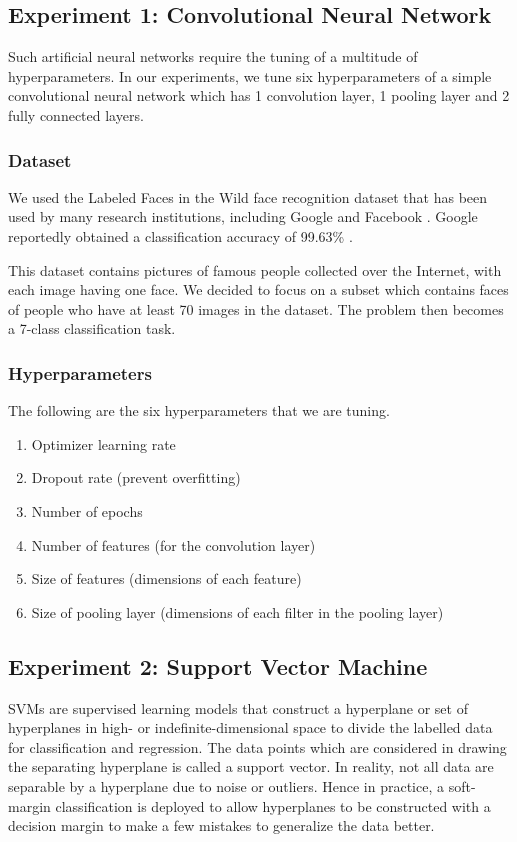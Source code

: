 \documentclass[letterpaper]{article}
\begin{document}
\subsection{Experiment 1: Convolutional Neural Network}
Such artificial neural networks require the tuning of a multitude of hyperparameters.
In our experiments, we tune six hyperparameters of a simple convolutional neural 
network which has 1 convolution layer, 1 pooling layer and 2 fully connected layers.

\subsubsection{Dataset}
We used the Labeled Faces in the Wild face recognition dataset that has been used
by many research institutions, including Google \cite{schroff2015facenet} and 
Facebook \cite{taigman2014deepface}. Google reportedly obtained a classification
accuracy of 99.63\% \cite{schroff2015facenet}.

This dataset contains pictures of famous people collected over the Internet, with 
each image having one face. We decided to focus on a subset which contains faces 
of people who have at least 70 images in the dataset. The problem then becomes 
a 7-class classification task.

\subsubsection{Hyperparameters}
The following are the six hyperparameters that we are tuning.

\begin{enumerate}

    \item Optimizer learning rate
    \item Dropout rate (prevent overfitting)
    \item Number of epochs
    \item Number of features (for the convolution layer)
    \item Size of features (dimensions of each feature)
    \item Size of pooling layer (dimensions of each filter in the pooling layer)

\end{enumerate}

\subsection{Experiment 2: Support Vector Machine}
SVMs are supervised learning models that construct a hyperplane or set of hyperplanes in high-
or indefinite-dimensional space to divide the labelled data for classification and regression.
The data points which are considered in drawing the separating hyperplane is called a support
vector. In reality, not all data are separable by a hyperplane due to noise or outliers. Hence in
practice, a soft-margin classification is deployed to allow hyperplanes to be constructed
with a decision margin to make a few mistakes to generalize the data better.
\end{document}
